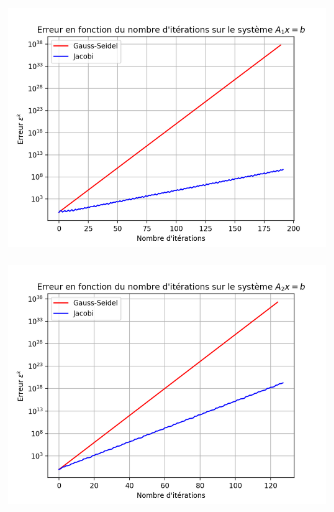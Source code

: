 \begin{figure}[H]
    \centering
    \includegraphics[width=0.75\textwidth]{graphes/graphs/resA1.png}
\end{figure}
\begin{figure}[H]
    \centering
    \includegraphics[width=0.75\textwidth]{graphes/graphs/resA2.png}
\end{figure}

